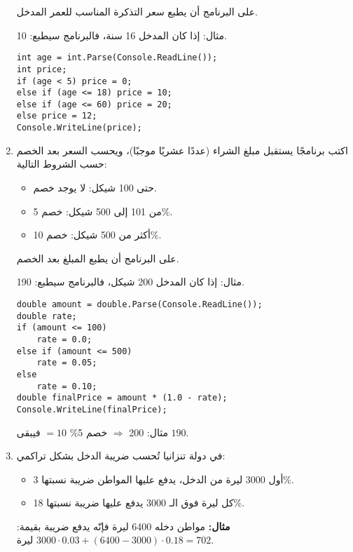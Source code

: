 \documentclass[12pt]{article}
\begin{document}
\begin{enumerate}[itemsep=2em]
على البرنامج أن يطبع سعر التذكرة المناسب للعمر المدخل.

مثال: إذا كان المدخل 16 سنة، فالبرنامج سيطبع: 10.

\ifwithsols
\begin{boxSolution}
\begin{english}
\begin{verbatim}
int age = int.Parse(Console.ReadLine());
int price;
if (age < 5) price = 0;
else if (age <= 18) price = 10;
else if (age <= 60) price = 20;
else price = 12;
Console.WriteLine(price);
\end{verbatim}
\end{english}
\end{boxSolution}
\fi


\item
اكتب برنامجًا يستقبل مبلغ الشراء (عددًا عشريًا موجبًا)، ويحسب السعر بعد الخصم حسب الشروط التالية:

\begin{itemize}
  \item حتى 100 شيكل: لا يوجد خصم.
  \item من 101 إلى 500 شيكل: خصم 5\%.
  \item أكثر من 500 شيكل: خصم 10\%.
\end{itemize}

على البرنامج أن يطبع المبلغ بعد الخصم.

مثال: إذا كان المدخل 200 شيكل، فالبرنامج سيطبع: 190.

\ifwithsols
\begin{boxSolution}
\begin{english}
\begin{verbatim}
double amount = double.Parse(Console.ReadLine());
double rate;
if (amount <= 100)
    rate = 0.0;
else if (amount <= 500)
    rate = 0.05;
else
    rate = 0.10;
double finalPrice = amount * (1.0 - rate);
Console.WriteLine(finalPrice);
\end{verbatim}
\end{english}
مثال: 200 \(\Rightarrow\) خصم 5\% \(=10\) فيبقى \(190\).
\end{boxSolution}
\fi


\item
في دولة تنزانيا تُحسب ضريبة الدخل بشكل تراكمي:
\begin{itemize}
    \item أول 3000 ليرة من الدخل، يدفع عليها المواطن ضريبة نسبتها 3\%.
    \item كل ليرة فوق الـ 3000 يدفع عليها ضريبة نسبتها 18\%.
\end{itemize}
\textbf{مثال:} مواطن دخله 6400 ليرة فإنّه يدفع ضريبة بقيمة: $3000 \cdot 0.03 + (6400 - 3000) \cdot 0.18 = 702$ ليرة.


\end{enumerate}
\end{document}
